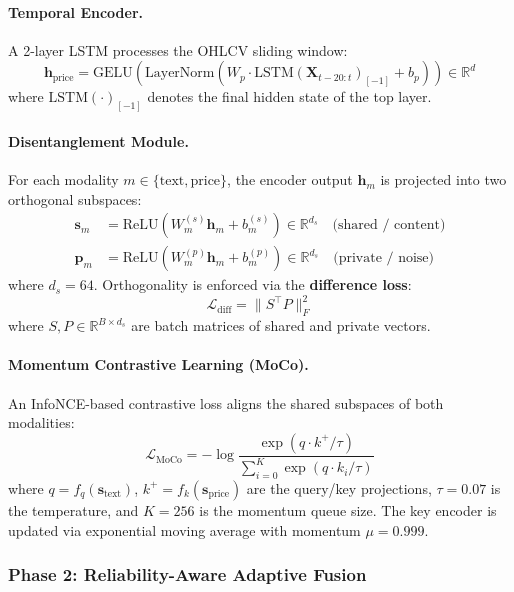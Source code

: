 \documentclass[12pt, a4paper]{article}
\begin{document}
\paragraph{Temporal Encoder.}

A 2-layer LSTM processes the OHLCV sliding window:
\[
    \mathbf{h}_\text{price} = \text{GELU}(\text{LayerNorm}(W_p \cdot \text{LSTM}(\mathbf{X}_{t-20:t})_{[-1]} + b_p)) \in \mathbb{R}^{d}
\]
where $\text{LSTM}(\cdot)_{[-1]}$ denotes the final hidden state of the top layer.

\paragraph{Disentanglement Module.}
\label{sec:disentangle}

For each modality $m \in \{\text{text}, \text{price}\}$, the encoder output $\mathbf{h}_m$ is projected into two orthogonal subspaces:
\begin{align}
    \mathbf{s}_m &= \text{ReLU}(W_m^{(s)} \mathbf{h}_m + b_m^{(s)}) \in \mathbb{R}^{d_s} \quad \text{(shared / content)} \\
    \mathbf{p}_m &= \text{ReLU}(W_m^{(p)} \mathbf{h}_m + b_m^{(p)}) \in \mathbb{R}^{d_s} \quad \text{(private / noise)}
\end{align}
where $d_s = 64$. Orthogonality is enforced via the \textbf{difference loss}:
\[
    \mathcal{L}_\text{diff} = \|S^\top P\|_F^2
\]
where $S, P \in \mathbb{R}^{B \times d_s}$ are batch matrices of shared and private vectors.

\paragraph{Momentum Contrastive Learning (MoCo).}

An InfoNCE-based contrastive loss aligns the shared subspaces of both modalities:
\[
    \mathcal{L}_\text{MoCo} = -\log \frac{\exp(q \cdot k^+ / \tau)}{\sum_{i=0}^{K} \exp(q \cdot k_i / \tau)}
\]
where $q = f_q(\mathbf{s}_\text{text})$, $k^+ = f_k(\mathbf{s}_\text{price})$ are the query/key projections, $\tau = 0.07$ is the temperature, and $K = 256$ is the momentum queue size. The key encoder is updated via exponential moving average with momentum $\mu = 0.999$.


\subsubsection{Phase 2: Reliability-Aware Adaptive Fusion}
\end{document}
